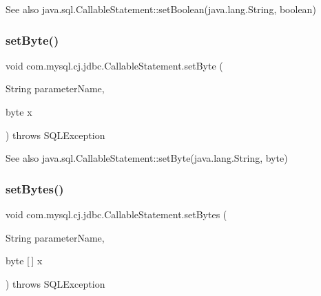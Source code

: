 \begin{DoxySeeAlso}{See also}
java.\+sql.\+Callable\+Statement\+::set\+Boolean(java.\+lang.\+String, boolean) 
\end{DoxySeeAlso}
\mbox{\label{classcom_1_1mysql_1_1cj_1_1jdbc_1_1_callable_statement_a212a0900b99fd7f7ddbe7a64eea6b1e4}} 
\subsubsection{\texorpdfstring{set\+Byte()}{setByte()}}
{\footnotesize\ttfamily void com.\+mysql.\+cj.\+jdbc.\+Callable\+Statement.\+set\+Byte (\begin{DoxyParamCaption}\item[{String}]{parameter\+Name,  }\item[{byte}]{x }\end{DoxyParamCaption}) throws S\+Q\+L\+Exception}

\begin{DoxySeeAlso}{See also}
java.\+sql.\+Callable\+Statement\+::set\+Byte(java.\+lang.\+String, byte) 
\end{DoxySeeAlso}
\mbox{\label{classcom_1_1mysql_1_1cj_1_1jdbc_1_1_callable_statement_aaa52a01483a9d999e9c8973064a063d9}} 
\subsubsection{\texorpdfstring{set\+Bytes()}{setBytes()}}
{\footnotesize\ttfamily void com.\+mysql.\+cj.\+jdbc.\+Callable\+Statement.\+set\+Bytes (\begin{DoxyParamCaption}\item[{String}]{parameter\+Name,  }\item[{byte \mbox{[}$\,$\mbox{]}}]{x }\end{DoxyParamCaption}) throws S\+Q\+L\+Exception}

